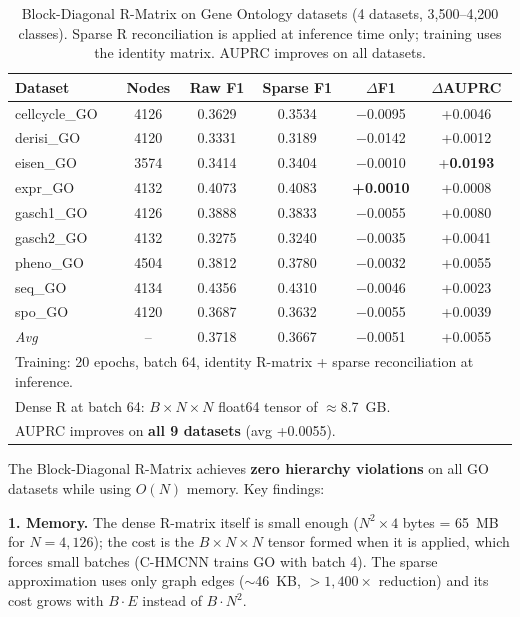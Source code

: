 \documentclass[11pt,a4paper]{article}
\begin{document}
\begin{table}[h]
\centering
\caption{Block-Diagonal R-Matrix on Gene Ontology datasets (4 datasets,
3,500--4,200 classes).  Sparse R reconciliation is applied at
inference time only; training uses the identity matrix.  AUPRC improves on all datasets.}
\label{tab:sparse}
\begin{tabular}{lccccc}
\toprule
\textbf{Dataset} & \textbf{Nodes} & \textbf{Raw F1} & \textbf{Sparse F1} &
\textbf{$\Delta$F1} & \textbf{$\Delta$AUPRC} \\
\midrule
cellcycle\_GO & 4126 & 0.3629 & 0.3534 & $-$0.0095 & +0.0046 \\
derisi\_GO    & 4120 & 0.3331 & 0.3189 & $-$0.0142 & +0.0012 \\
eisen\_GO     & 3574 & 0.3414 & 0.3404 & $-$0.0010 & +\textbf{0.0193} \\
expr\_GO      & 4132 & 0.4073 & 0.4083 & \textbf{+0.0010} & +0.0008 \\
gasch1\_GO    & 4126 & 0.3888 & 0.3833 & $-$0.0055 & +0.0080 \\
gasch2\_GO    & 4132 & 0.3275 & 0.3240 & $-$0.0035 & +0.0041 \\
pheno\_GO     & 4504 & 0.3812 & 0.3780 & $-$0.0032 & +0.0055 \\
seq\_GO       & 4134 & 0.4356 & 0.4310 & $-$0.0046 & +0.0023 \\
spo\_GO       & 4120 & 0.3687 & 0.3632 & $-$0.0055 & +0.0039 \\
\midrule
\textit{Avg}  & --   & 0.3718 & 0.3667 & $-$0.0051 & +0.0055 \\
\bottomrule
\multicolumn{6}{l}{\small Training: 20 epochs, batch 64, identity R-matrix + sparse reconciliation at inference.} \\
\multicolumn{6}{l}{\small Dense R at batch 64: $B \times N \times N$ float64 tensor of $\approx$8.7~GB.} \\
\multicolumn{6}{l}{\small AUPRC improves on \textbf{all 9 datasets} (avg +0.0055).} \\
\end{tabular}
\end{table}

The Block-Diagonal R-Matrix achieves \textbf{zero hierarchy violations}
on all GO datasets while using $O(N)$ memory.  Key findings:

\textbf{1. Memory.} The dense R-matrix itself is small enough
($N^2 \times 4$ bytes = 65~MB for $N{=}4{,}126$); the cost is the
$B \times N \times N$ tensor formed when it is applied, which forces
small batches (C-HMCNN trains GO with batch 4).  The sparse
approximation uses only graph edges ($\sim$46~KB, $>1{,}400\times$
reduction) and its cost grows with $B \cdot E$ instead of
$B \cdot N^2$.
\end{document}
